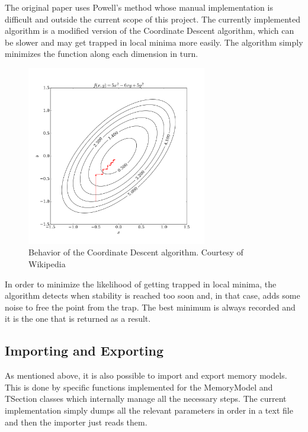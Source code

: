 The original paper uses Powell's method whose manual implementation is difficult and outside the current scope of this project. The currently implemented algorithm is a modified version of the Coordinate Descent algorithm, which can be slower and may get trapped in local minima more easily. The algorithm simply minimizes the function along each dimension in turn.
\begin{figure}[htbp]
    \center
    \includegraphics[width = 0.7\textwidth]{img/coordinate_descent}
    \caption{Behavior of the Coordinate Descent algorithm. Courtesy of Wikipedia\autocite{CoordinateDescent}}
    \label{fig:example-output}
\end{figure}
In order to minimize the likelihood of getting trapped in local minima, the algorithm detects when stability is reached too soon and, in that case, adds some noise to free the point from the trap. The best minimum is always recorded and it is the one that is returned as a result.

\subsection{Importing and Exporting}
As mentioned above, it is also possible to import and export memory models. This is done by specific functions implemented for the MemoryModel and TSection classes which internally manage all the necessary steps. The current implementation simply dumps all the relevant parameters in order in a text file and then the importer just reads them.

